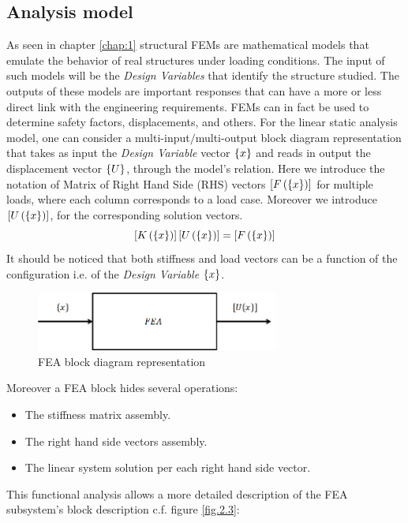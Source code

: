 \subsection {Analysis model}
As seen in chapter \ref{chap:1} structural FEMs are mathematical models that emulate the behavior of real structures under loading conditions. The input of such models will be the \textit{Design Variables} that identify the structure studied. The outputs of these models are important responses that can have a more or less direct link with the engineering requirements. FEMs can in fact be used to determine safety factors, displacements, and others. For the linear static analysis model, one can consider a multi-input$/$multi-output block diagram representation that takes as input the \textit{Design Variable} vector $\left\lbrace{x}\right \rbrace$ and reads in output the displacement vector $\left\lbrace{U}\right \rbrace$, through the model's relation. Here we introduce the notation of Matrix of Right Hand Side (RHS) vectors $\left[{F\left(\left\lbrace{x}\right \rbrace\right)}\right]$ for multiple loads, where each column corresponds to a load case. Moreover we introduce $\left[{U\left(\left\lbrace{x}\right \rbrace\right)}\right]$, for the corresponding solution vectors.
\begin{equation}
\label{eq2.1}
\left[{K\left(\left\lbrace{x}\right \rbrace\right)}\right]\left[{U\left(\left\lbrace{x}\right \rbrace\right)}\right]=\left[{F\left(\left\lbrace{x}\right \rbrace\right)}\right]
\end{equation}
It should be noticed that both stiffness and load vectors can be a function of the configuration i.e. of the  \textit{Design Variable} $\left\lbrace{x}\right \rbrace$.
\begin{figure}[ht]
\centering
\includegraphics[width=8cm]{images/Ch2/Block_diagram_FEA}
\caption{FEA block diagram representation}
\label{fig.2.2}
\end{figure}
Moreover a FEA block hides several operations:
\begin{itemize}
\item The stiffness matrix assembly.
\item The right hand side vectors assembly.
\item The linear system solution per each right hand side vector.
\end{itemize}
This functional analysis allows a more detailed description of the FEA subsystem's block description c.f. figure \ref{fig.2.3}:\\
